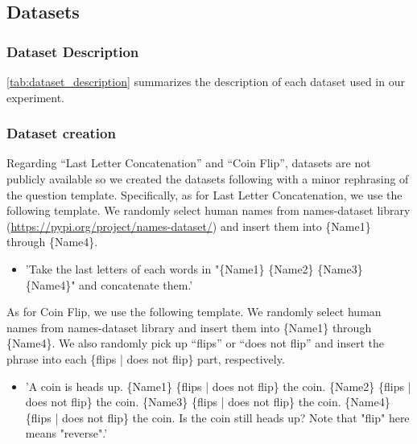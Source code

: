 \documentclass{article}
\newcommand{\kojima}[1]{{\color{red}[{#1} --TK]}}
\begin{document}
\subsection{Datasets}
\label{appx:dataset_description}

\subsubsection{Dataset Description}

\autoref{tab:dataset_description} summarizes the description of each dataset used in our experiment.



\subsubsection{Dataset creation}
\label{appx:dataset_creation}

Regarding ``Last Letter Concatenation'' and ``Coin Flip'', datasets are not publicly available so we created the datasets following \cite{cot_wei} with a minor rephrasing of the question template. Specifically, as for Last Letter Concatenation, we use the following template. We randomly select human names from names-dataset library (\url{https://pypi.org/project/names-dataset/}) and insert them into \{Name1\} through \{Name4\}.

\begin{itemize}
    \item 'Take the last letters of each words in "\{Name1\} \{Name2\} \{Name3\} \{Name4\}" and concatenate them.'
\end{itemize}

As for Coin Flip, we use the following template. We randomly select human names from names-dataset library and insert them into \{Name1\} through \{Name4\}. We also randomly pick up ``flips'' or ``does not flip'' and insert the phrase into each \{flips | does not flip\} part, respectively.

\begin{itemize}
    \item 'A coin is heads up. \{Name1\} \{flips | does not flip\} the coin. \{Name2\} \{flips | does not flip\} the coin. \{Name3\} \{flips | does not flip\} the coin. \{Name4\} \{flips | does not flip\} the coin. Is the coin still heads up? Note that "flip" here means "reverse".'
\end{itemize}
\end{document}
